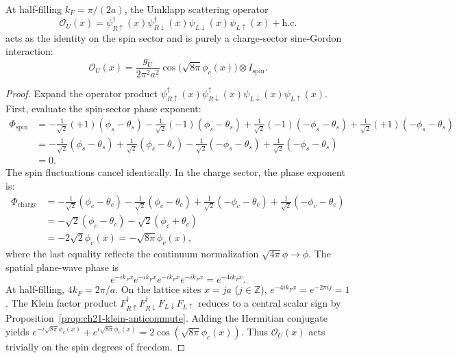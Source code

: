 \begin{theorem}
\label{thm:ch21-umklapp-spin-cancel}
At half-filling $k_F = \pi/(2a)$, the Umklapp scattering operator
\[
 \mathcal O_U(x) = \psi_{R\uparrow}^\dagger(x) \psi_{R\downarrow}^\dagger(x) \psi_{L\downarrow}(x) \psi_{L\uparrow}(x) + \text{h.c.}
\]
acts as the identity on the spin sector and is purely a charge-sector sine-Gordon interaction:
\begin{equation}
 \boxed{
 \mathcal O_U(x) = \frac{g_U}{2\pi^2 a^2} \cos\bigl(\sqrt{8\pi}\phi_c(x)\bigr) \otimes I_{\mathrm{spin}}.
 }
 \label{eq:ch21-umklapp-bosonized}
\end{equation}
\end{theorem}
\begin{proof}
Expand the operator product $\psi_{R\uparrow}^\dagger(x) \psi_{R\downarrow}^\dagger(x) \psi_{L\downarrow}(x) \psi_{L\uparrow}(x)$.
First, evaluate the spin-sector phase exponent:
\begin{align*}
 \Phi_{\mathrm{spin}}
  &= -\frac{1}{\sqrt{2}} (+1) (\phi_s - \theta_s)
     -\frac{1}{\sqrt{2}} (-1) (\phi_s - \theta_s)
     +\frac{1}{\sqrt{2}} (-1) (-\phi_s - \theta_s)
     +\frac{1}{\sqrt{2}} (+1) (-\phi_s - \theta_s) \\
  &= -\frac{1}{\sqrt{2}}(\phi_s - \theta_s) + \frac{1}{\sqrt{2}}(\phi_s - \theta_s)
     -\frac{1}{\sqrt{2}}(-\phi_s - \theta_s) + \frac{1}{\sqrt{2}}(-\phi_s - \theta_s) \\
  &= 0.
\end{align*}
The spin fluctuations cancel identically.
In the charge sector, the phase exponent is:
\begin{align*}
 \Phi_{\mathrm{charge}}
  &= -\frac{1}{\sqrt{2}} (\phi_c - \theta_c)
     -\frac{1}{\sqrt{2}} (\phi_c - \theta_c)
     +\frac{1}{\sqrt{2}} (-\phi_c - \theta_c)
     +\frac{1}{\sqrt{2}} (-\phi_c - \theta_c) \\
  &= -\sqrt{2}(\phi_c - \theta_c) - \sqrt{2}(\phi_c + \theta_c) \\
  &= -2\sqrt{2}\phi_c(x) = -\sqrt{8\pi}\phi_c(x),
\end{align*}
where the last equality reflects the continuum normalization $\sqrt{4\pi}\phi \to \phi$.
The spatial plane-wave phase is
\[
 e^{-i k_F x} e^{-i k_F x} e^{-i k_F x} e^{-i k_F x} = e^{-4 i k_F x}.
\]
At half-filling, $4 k_F = 2\pi/a$.  On the lattice sites $x = j a$ ($j \in \mathbb Z$),
$e^{-4 i k_F x} = e^{-2\pi i j} = 1$.
The Klein factor product $F_{R\uparrow}^\dagger F_{R\downarrow}^\dagger F_{L\downarrow} F_{L\uparrow}$ reduces
to a central scalar sign by Proposition~\ref{prop:ch21-klein-anticommute}.
Adding the Hermitian conjugate yields $e^{-i\sqrt{8\pi}\phi_c(x)} + e^{i\sqrt{8\pi}\phi_c(x)} = 2\cos(\sqrt{8\pi}\phi_c(x))$.
Thus $\mathcal O_U(x)$ acts trivially on the spin degrees of freedom.
\end{proof}

